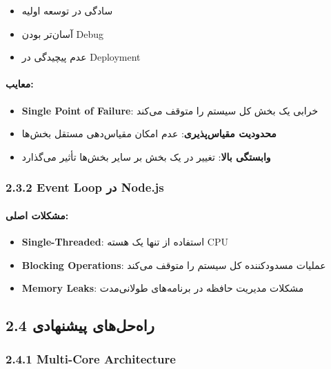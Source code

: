 \documentclass[
]{article}
\providecommand{\tightlist}{%
  \setlength{\itemsep}{0pt}\setlength{\parskip}{0pt}}
\begin{document}
\begin{itemize}
\tightlist
\item
  سادگی در توسعه اولیه
\item
  آسان‌تر بودن Debug
\item
  عدم پیچیدگی در Deployment
\end{itemize}

\paragraph{معایب:}\label{ux645ux639ux627ux6ccux628}

\begin{itemize}
\tightlist
\item
  \textbf{Single Point of Failure}: خرابی یک بخش کل سیستم را متوقف می‌کند
\item
  \textbf{محدودیت مقیاس‌پذیری}: عدم امکان مقیاس‌دهی مستقل بخش‌ها
\item
  \textbf{وابستگی بالا}: تغییر در یک بخش بر سایر بخش‌ها تأثیر می‌گذارد
\end{itemize}

\subsubsection{2.3.2 Event Loop در
Node.js}\label{event-loop-ux62fux631-node.js}

\paragraph{مشکلات
اصلی:}\label{ux645ux634ux6a9ux644ux627ux62a-ux627ux635ux644ux6cc}

\begin{itemize}
\tightlist
\item
  \textbf{Single-Threaded}: استفاده از تنها یک هسته CPU
\item
  \textbf{Blocking Operations}: عملیات مسدودکننده کل سیستم را متوقف
  می‌کند
\item
  \textbf{Memory Leaks}: مشکلات مدیریت حافظه در برنامه‌های طولانی‌مدت
\end{itemize}

\subsection{2.4 راه‌حل‌های
پیشنهادی}\label{ux631ux627ux647ux62dux644ux647ux627ux6cc-ux67eux6ccux634ux646ux647ux627ux62fux6cc}

\subsubsection{2.4.1 Multi-Core
Architecture}\label{multi-core-architecture}
\end{document}
